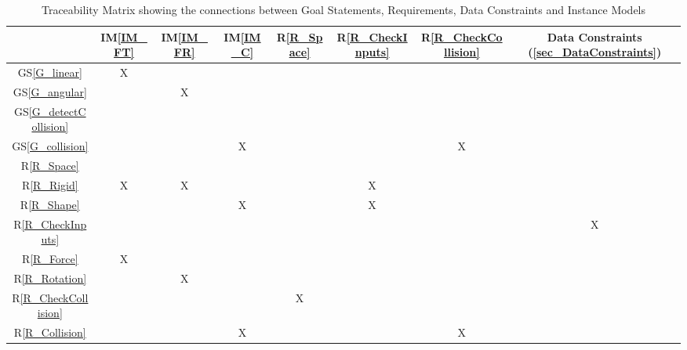 \documentclass[12pt]{article}
\newcommand{\gsref}[1]{GS\ref{#1}}
\newcommand{\iref}[1]{IM\ref{#1}}
\newcommand{\rref}[1]{R\ref{#1}}
\begin{document}
\renewcommand*{\thetable}{3}
\begin{table}[h!]
\renewcommand*{\arraystretch}{1.2}
\centering
\begin{tabular}{|c|c|c|c|c|c|c|c|}
\hline
& \iref{IM_FT} & \iref{IM_FR} & \iref{IM_C} & \rref{R_Space} & \rref{R_CheckInputs} & \rref{R_CheckCollision} & Data Constraints (\ref{sec_DataConstraints}) \\ \hline
\gsref{G_linear}			&X& & & & & & \\ \hline
\gsref{G_angular} 			& &X& & & & & \\ \hline
\gsref{G_detectCollision} 	& & & & & & & \\ \hline
\gsref{G_collision} 		& & &X& & &X& \\ \hline
\rref{R_Space} 				& & & & & & & \\ \hline
\rref{R_Rigid} 				&X&X& & &X& & \\ \hline
\rref{R_Shape} 				& & &X& &X& & \\ \hline
\rref{R_CheckInputs} 		& & & & & & &X\\ \hline
\rref{R_Force} 				&X& & & & & & \\ \hline
\rref{R_Rotation} 			& &X& & & & & \\ \hline
\rref{R_CheckCollision} 	& & & &X& & & \\ \hline
\rref{R_Collision} 			& & &X& & &X& \\ \hline
\end{tabular}
\bigskip
\caption{Traceability Matrix showing the connections between Goal Statements, Requirements, Data Constraints and Instance Models} \label{RTraceMatrix}
\end{table}
\end{document}
